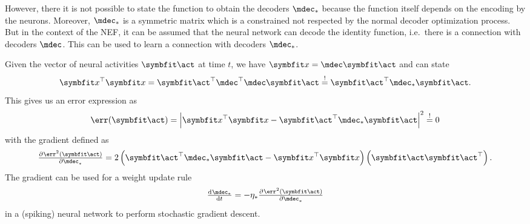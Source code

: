 However, there it is not possible to state the function to obtain the decoders $\mdec_*$ because the function itself depends on the encoding by the neurons.
Moreover, $\mdec_*$ is a symmetric matrix which is a constrained not respected by the normal decoder optimization process.
But in the context of the NEF, it can be assumed that the neural network can decode the identity function, i.e.\ there is a connection with decoders $\mdec$.
This can be used to learn a connection with decoders $\mdec_*$.

Given the vector of neural activities $\vc \act$ at time $t$, we have $\vc x = \mdec \vc \act$ and can state
\begin{equation}
    \vc x\Tr \vc x = \vc \act\Tr \mdec\Tr \mdec \vc\act \overset{!}{=} \vc\act\Tr\mdec_*\vc\act \text{.}
\end{equation}
This gives us an error expression as
\begin{equation}
    \err(\vc\act) = \left\lvert\vc x\Tr \vc x - \vc\act\Tr \mdec_* \vc\act\right\rvert^2 \overset{!}{=} 0
\end{equation}
with the gradient defined as
\begin{equation}
    \pd{\err^2(\vc\act)}{\mdec_*} = 2 \del{\vc\act\Tr \mdec_* \vc\act - \vc x\Tr \vc x} \del{\vc\act \vc\act\Tr} \text{.}
\end{equation}
The gradient can be used for a weight update rule
\begin{equation}
    \od{\mdec_*}{t} = -\eta_* \pd{\err^2(\vc\act)}{\mdec_*}
\end{equation}
in a (spiking) neural network to perform stochastic gradient descent.

